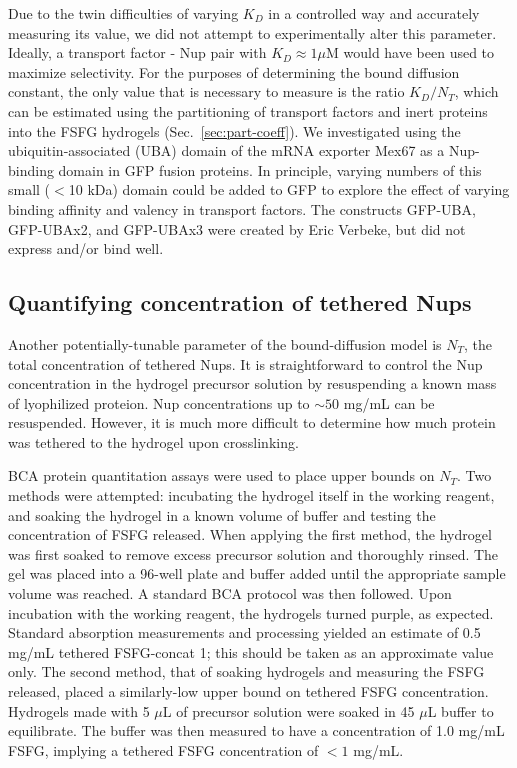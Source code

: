 Due to the twin difficulties of varying $K_D$ in a controlled way and accurately measuring its value, we did not attempt to experimentally alter this parameter.  Ideally, a transport factor - Nup pair with $K_D \approx 1 \mu$M would have been used to maximize selectivity.  For the purposes of determining the bound diffusion constant, the only value that is necessary to measure is the ratio $K_D/N_T$, which can be estimated using the partitioning of transport factors and inert proteins into the FSFG hydrogels (Sec.~\ref{sec:part-coeff}).  We investigated using the ubiquitin-associated (UBA) domain of the mRNA exporter Mex67 as a Nup-binding domain in GFP fusion proteins.  In principle, varying numbers of this small ($<$10 kDa) domain could be added to GFP to explore the effect of varying binding affinity and valency in transport factors.  The constructs GFP-UBA, GFP-UBAx2, and GFP-UBAx3 were created by Eric Verbeke, but did not express and/or bind well.


\subsection{Quantifying concentration of tethered Nups}

Another potentially-tunable parameter of the bound-diffusion model is $N_T$, the total concentration of tethered Nups.  It is straightforward to control the Nup concentration in the hydrogel precursor solution by resuspending a known mass of lyophilized proteion.  Nup concentrations up to $\sim 50$ mg/mL can be resuspended.  However, it is much more difficult to determine how much protein was tethered to the hydrogel upon crosslinking. 

 BCA protein quantitation assays were used to place upper bounds on $N_T$.  Two methods were attempted: incubating the hydrogel itself in the working reagent, and soaking the hydrogel in a known volume of buffer and testing the concentration of FSFG released.  When applying the first method, the hydrogel was first soaked to remove excess precursor solution and thoroughly rinsed.  The gel was placed into a 96-well plate and buffer added until the appropriate sample volume was reached.  A standard BCA protocol was then followed.  Upon incubation with the working reagent, the hydrogels turned purple, as expected.  Standard absorption measurements and processing yielded an estimate of 0.5 mg/mL tethered FSFG-concat 1; this should be taken as an approximate value only.  The second method, that of soaking hydrogels and measuring the FSFG released, placed a similarly-low upper bound on tethered FSFG concentration.  Hydrogels made with 5 $\mu$L of precursor solution were soaked in 45 $\mu$L buffer to equilibrate.  The buffer was then measured to have a concentration of 1.0 mg/mL FSFG, implying a tethered FSFG concentration of $<1$ mg/mL.


